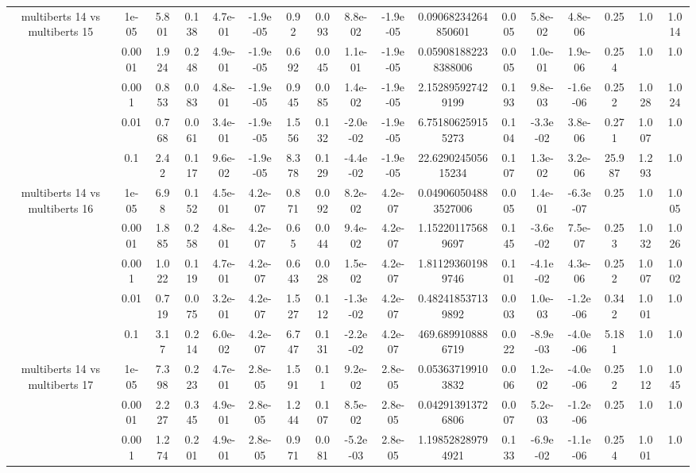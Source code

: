 \begin{tabular}{|c|c|c|c|c|c|c|c|c|c|c|c|c|c|c|c|c|}
\hline
\multirow{5}{*}{multiberts 14 vs multiberts 15} & 1e-05 & 5.801 & 0.138 & 4.7e-01 & -1.9e-05 & 0.92 & 0.093 & 8.8e-02 & -1.9e-05 & 0.09068234264850601 & 0.005 & 5.8e-02 & 4.8e-06 & 0.25 & 1.0 & 1.014 \\
 & 0.0001 & 1.924 & 0.248 & 4.9e-01 & -1.9e-05 & 0.692 & 0.045 & 1.1e-01 & -1.9e-05 & 0.059081882238388006 & 0.005 & 1.0e-01 & 1.9e-06 & 0.254 & 1.0 & 1.0 \\
 & 0.001 & 0.853 & 0.083 & 4.8e-01 & -1.9e-05 & 0.945 & 0.085 & 1.4e-02 & -1.9e-05 & 2.152895927429199 & 0.193 & 9.8e-03 & -1.6e-06 & 0.252 & 1.028 & 1.024 \\
 & 0.01 & 0.768 & 0.061 & 3.4e-01 & -1.9e-05 & 1.556 & 0.132 & -2.0e-02 & -1.9e-05 & 6.751806259155273 & 0.104 & -3.3e-02 & 3.8e-06 & 0.271 & 1.007 & 1.0 \\
 & 0.1 & 2.42 & 0.117 & 9.6e-02 & -1.9e-05 & 8.378 & 0.129 & -4.4e-02 & -1.9e-05 & 22.629024505615234 & 0.107 & 1.3e-02 & 3.2e-06 & 25.987 & 1.293 & 1.0 \\
\hline
\multirow{5}{*}{multiberts 14 vs multiberts 16} & 1e-05 & 6.98 & 0.152 & 4.5e-01 & 4.2e-07 & 0.871 & 0.092 & 8.2e-02 & 4.2e-07 & 0.049060504883527006 & 0.005 & 1.4e-01 & -6.3e-07 & 0.25 & 1.0 & 1.005 \\
 & 0.0001 & 1.885 & 0.258 & 4.8e-01 & 4.2e-07 & 0.65 & 0.044 & 9.4e-02 & 4.2e-07 & 1.152201175689697 & 0.145 & -3.6e-02 & 7.5e-07 & 0.253 & 1.032 & 1.026 \\
 & 0.001 & 1.022 & 0.119 & 4.7e-01 & 4.2e-07 & 0.643 & 0.028 & 1.5e-02 & 4.2e-07 & 1.811293601989746 & 0.101 & -4.1e-02 & 4.3e-06 & 0.252 & 1.007 & 1.002 \\
 & 0.01 & 0.719 & 0.075 & 3.2e-01 & 4.2e-07 & 1.527 & 0.112 & -1.3e-02 & 4.2e-07 & 0.482418537139892 & 0.003 & 1.0e-03 & -1.2e-06 & 0.342 & 1.001 & 1.0 \\
 & 0.1 & 3.17 & 0.214 & 6.0e-02 & 4.2e-07 & 6.747 & 0.131 & -2.2e-02 & 4.2e-07 & 469.6899108886719 & 0.022 & -8.9e-03 & -4.0e-06 & 5.181 & 1.0 & 1.0 \\
\hline
\multirow{5}{*}{multiberts 14 vs multiberts 17} & 1e-05 & 7.398 & 0.223 & 4.7e-01 & 2.8e-05 & 1.591 & 0.11 & 9.2e-02 & 2.8e-05 & 0.053637199103832 & 0.006 & 1.2e-02 & -4.0e-06 & 0.252 & 1.012 & 1.045 \\
 & 0.0001 & 2.227 & 0.345 & 4.9e-01 & 2.8e-05 & 1.244 & 0.107 & 8.5e-02 & 2.8e-05 & 0.042913913726806 & 0.007 & 5.2e-03 & -1.2e-06 & 0.25 & 1.0 & 1.0 \\
 & 0.001 & 1.274 & 0.201 & 4.9e-01 & 2.8e-05 & 0.971 & 0.081 & -5.2e-03 & 2.8e-05 & 1.198528289794921 & 0.133 & -6.9e-02 & -1.1e-06 & 0.254 & 1.001 & 1.0 \\

\end{tabular}
